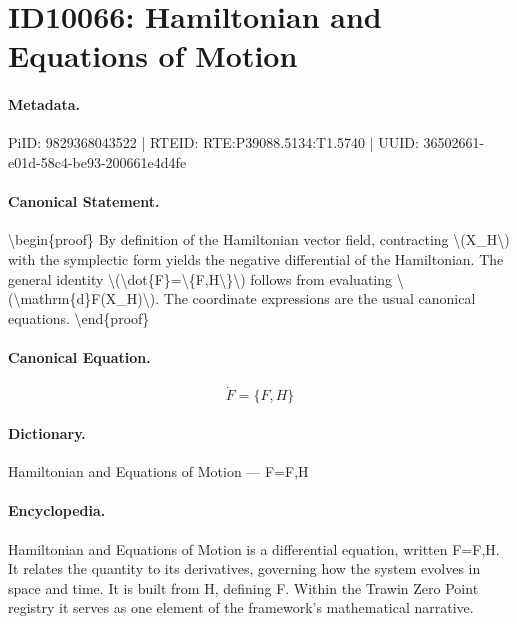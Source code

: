 \section*{ID10066: Hamiltonian and Equations of Motion}
\paragraph{Metadata.}
PiID: 9829368043522 | RTEID: RTE:P39088.5134:T1.5740 | UUID: 36502661-e01d-58c4-be93-200661e4d4fe

\paragraph{Canonical Statement.}
\textbackslash{}begin\{proof\} By definition of the Hamiltonian vector field, contracting \textbackslash{}(X\_H\textbackslash{}) with the symplectic form yields the negative differential of the Hamiltonian. The general identity \textbackslash{}(\textbackslash{}dot\{F\}=\textbackslash{}\{F,H\textbackslash{}\}\textbackslash{}) follows from evaluating \textbackslash{}(\textbackslash{}mathrm\{d\}F(X\_H)\textbackslash{}). The coordinate expressions are the usual canonical equations. \textbackslash{}end\{proof\}

\paragraph{Canonical Equation.}
\[
\dot{F}=\{F,H\}
\]

\paragraph{Dictionary.}
Hamiltonian and Equations of Motion — F=F,H

\paragraph{Encyclopedia.}
Hamiltonian and Equations of Motion is a differential equation, written F=F,H. It relates the quantity to its derivatives, governing how the system evolves in space and time. It is built from H, defining F. Within the Trawin Zero Point registry it serves as one element of the framework's mathematical narrative.
